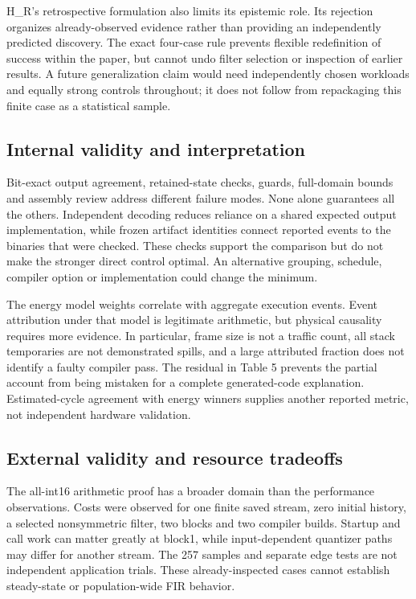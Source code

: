 \documentclass[conference]{IEEEtran}
\begin{document}
H\_R's retrospective formulation also limits its epistemic role. Its
rejection organizes already-observed evidence rather than providing an
independently predicted discovery. The exact four-case rule prevents
flexible redefinition of success within the paper, but cannot undo
filter selection or inspection of earlier results. A future
generalization claim would need independently chosen workloads and
equally strong controls throughout; it does not follow from repackaging
this finite case as a statistical sample.

\subsection{Internal validity and interpretation}\label{internal-validity-and-interpretation}

Bit-exact output agreement, retained-state checks, guards, full-domain
bounds and assembly review address different failure modes. None alone
guarantees all the others. Independent decoding reduces reliance on a
shared expected output implementation, while frozen artifact identities
connect reported events to the binaries that were checked. These checks
support the comparison but do not make the stronger direct control
optimal. An alternative grouping, schedule, compiler option or
implementation could change the minimum.

The energy model weights correlate with aggregate execution events.
Event attribution under that model is legitimate arithmetic, but
physical causality requires more evidence. In particular, frame size is
not a traffic count, all stack temporaries are not demonstrated spills,
and a large attributed fraction does not identify a faulty compiler
pass. The residual in Table 5 prevents the partial account from being
mistaken for a complete generated-code explanation. Estimated-cycle
agreement with energy winners supplies another reported metric, not
independent hardware validation.

\subsection{External validity and resource tradeoffs}\label{external-validity-and-resource-tradeoffs}

The all-int16 arithmetic proof has a broader domain than the performance
observations. Costs were observed for one finite saved stream, zero
initial history, a selected nonsymmetric filter, two blocks and two
compiler builds. Startup and call work can matter greatly at block1,
while input-dependent quantizer paths may differ for another stream. The
257 samples and separate edge tests are not independent application
trials. These already-inspected cases cannot establish steady-state or
population-wide FIR behavior.
\end{document}
